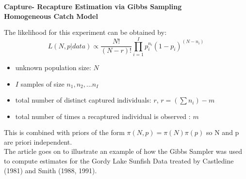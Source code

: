 \documentclass[dvipsnames,mathserif]{beamer}
\begin{document}
{\begin{frame}
    \begin{center}
    \large \textbf{Capture- Recapture Estimation via Gibbs Sampling}\\ \vspace{1.5mm}
    \footnotesize
      \textbf{Homogeneous Catch Model}\\
      \end{center}
      The likelihood for this experiment can be obtained by: $$L(N,p|data) \propto \frac{N!}{(N-r)!} \prod^{I}_{i=1} p_{i}^{n_{i}}(1-p_{i})^{(N-n_{i})}$$
      \begin{itemize}
          \item unknown population size: $N$
          \item $I$ samples of size $n_{1}, n_{2}, ... n_{I}$
          \item total number of distinct captured individuals: $r$, $r=(\sum n_{i}) -m$
          \item total number of times a recaptured individual is observed : $m$
      \end{itemize}
      This is combined with priors of the form $\pi(N,p) = \pi(N) \pi(p)$ so N and p are priori independent. \\ \vspace{1.5mm}
      The article goes on to illustrate an example of how the Gibbs Sampler was used to compute estimates for the Gordy Lake Sunfish Data treated by Castledine (1981) and Smith (1988, 1991).
    \end{frame} 
    


}
\end{document}
